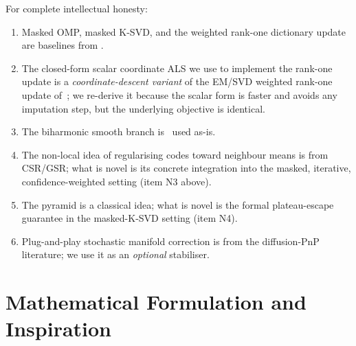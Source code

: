 \documentclass[11pt,a4paper]{article}
\theoremstyle{definition}
\theoremstyle{remark}
\begin{document}
For complete intellectual honesty:
\begin{enumerate}[label=$\circ$,leftmargin=2.4em,itemsep=2pt]
\item Masked OMP, masked K-SVD, and the weighted rank-one dictionary
  update are baselines from
  \cite{mairal2008sparse,srebro2003weighted,naumova2018itkrmm,tiefenthaler2018thesis}.
\item The closed-form scalar coordinate ALS we use to implement the
  rank-one update is a \emph{coordinate-descent variant} of the
  EM/SVD weighted rank-one update of~\cite{srebro2003weighted}; we
  re-derive it because the scalar form is faster and avoids any
  imputation step, but the underlying objective is identical.
\item The biharmonic smooth branch is~\cite{chan2002mathematical}
  used as-is.
\item The non-local idea of regularising codes toward neighbour means
  is from CSR/GSR; what is novel is its concrete integration into
  the masked, iterative, confidence-weighted setting (item N3 above).
\item The pyramid is a classical idea; what is novel is the formal
  plateau-escape guarantee in the masked-K-SVD setting (item N4).
\item Plug-and-play stochastic manifold correction is from the
  diffusion-PnP literature; we use it as an \emph{optional} stabiliser.
\end{enumerate}

\section{Mathematical Formulation and Inspiration}
\end{document}
